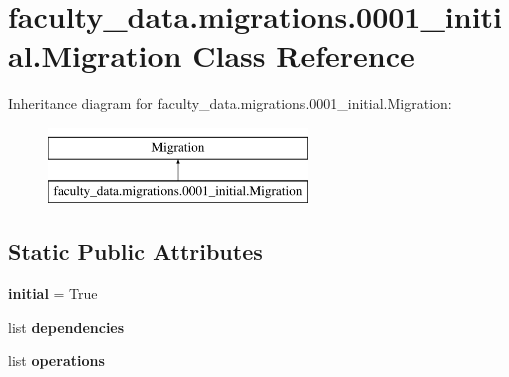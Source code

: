 \hypertarget{classfaculty__data_1_1migrations_1_10001__initial_1_1_migration}{\section{faculty\-\_\-data.\-migrations.0001\-\_\-initial.Migration Class Reference}
\label{classfaculty__data_1_1migrations_1_10001__initial_1_1_migration}
}
Inheritance diagram for faculty\-\_\-data.\-migrations.0001\-\_\-initial.Migration\-:\begin{figure}[H]
\begin{center}
\leavevmode
\includegraphics[height=2.000000cm]{classfaculty__data_1_1migrations_1_10001__initial_1_1_migration}
\end{center}
\end{figure}
\subsection*{Static Public Attributes}
\begin{DoxyCompactItemize}
\item 
\hypertarget{classfaculty__data_1_1migrations_1_10001__initial_1_1_migration_a87fa990bdc19b1b865db7693c75b0195}{{\bfseries initial} = True}\label{classfaculty__data_1_1migrations_1_10001__initial_1_1_migration_a87fa990bdc19b1b865db7693c75b0195}

\item 
list {\bfseries dependencies}
\item 
list {\bfseries operations}
\end{DoxyCompactItemize}


